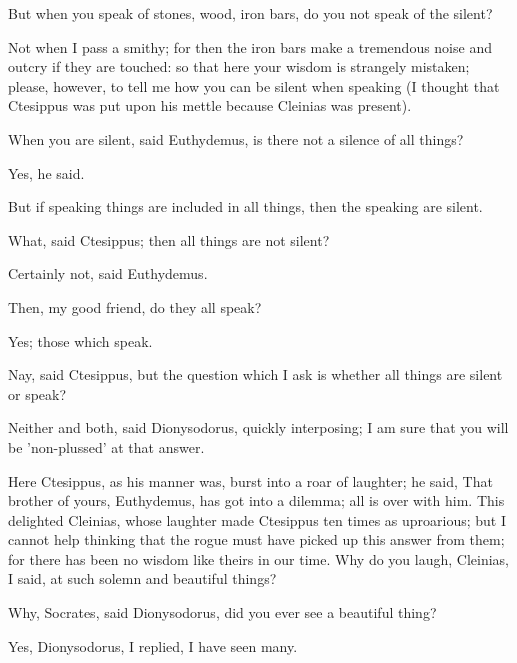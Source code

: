 \documentclass[11pt,letter]{article}
\begin{document}
\par  But when you speak of stones, wood, iron bars, do you not speak of the silent?

\par  Not when I pass a smithy; for then the iron bars make a tremendous noise and outcry if they are touched: so that here your wisdom is strangely mistaken; please, however, to tell me how you can be silent when speaking (I thought that Ctesippus was put upon his mettle because Cleinias was present).

\par  When you are silent, said Euthydemus, is there not a silence of all things?

\par  Yes, he said.

\par  But if speaking things are included in all things, then the speaking are silent.

\par  What, said Ctesippus; then all things are not silent?

\par  Certainly not, said Euthydemus.

\par  Then, my good friend, do they all speak?

\par  Yes; those which speak.

\par  Nay, said Ctesippus, but the question which I ask is whether all things are silent or speak?

\par  Neither and both, said Dionysodorus, quickly interposing; I am sure that you will be 'non-plussed' at that answer.

\par  Here Ctesippus, as his manner was, burst into a roar of laughter; he said, That brother of yours, Euthydemus, has got into a dilemma; all is over with him. This delighted Cleinias, whose laughter made Ctesippus ten times as uproarious; but I cannot help thinking that the rogue must have picked up this answer from them; for there has been no wisdom like theirs in our time. Why do you laugh, Cleinias, I said, at such solemn and beautiful things?

\par  Why, Socrates, said Dionysodorus, did you ever see a beautiful thing?

\par  Yes, Dionysodorus, I replied, I have seen many.
\end{document}
